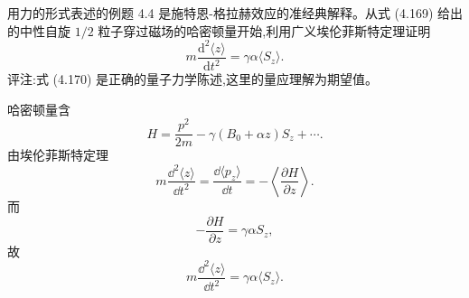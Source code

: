 \begin{question}
用力的形式表述的例题 4.4 是施特恩-格拉赫效应的准经典解释。从式 (4.169) 给出的中性自旋 $1/2$ 粒子穿过磁场的哈密顿量开始,利用广义埃伦菲斯特定理证明
\[
m\frac{\mathrm d^2\langle z\rangle}{\mathrm dt^2}=\gamma\alpha\langle S_z\rangle.
\]
评注:式 (4.170) 是正确的量子力学陈述,这里的量应理解为期望值。

\par\smallskip
{}

\end{question}
\begin{solution}

哈密顿量含
\[
H=\frac{p^2}{2m}-\gamma(B_0+\alpha z)S_z+\cdots.
\]
由埃伦菲斯特定理
\[
m\frac{\dd^2\langle z\rangle}{\dd t^2}=\frac{\dd\langle p_z\rangle}{\dd t}
=-\left\langle\frac{\partial H}{\partial z}\right\rangle.
\]
而
\[
-\frac{\partial H}{\partial z}=\gamma\alpha S_z,
\]
故
\[
m\frac{\dd^2\langle z\rangle}{\dd t^2}=\gamma\alpha\langle S_z\rangle.
\]

\end{solution}

